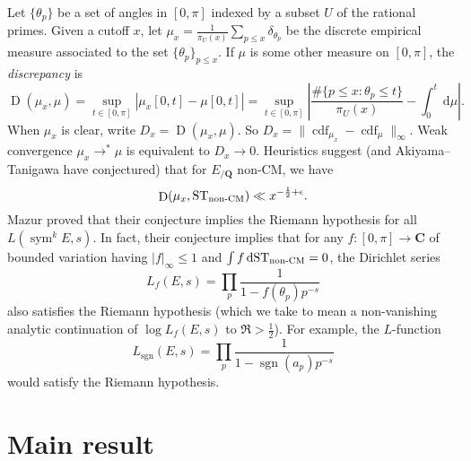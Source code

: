 \documentclass{article}
\DeclareMathOperator{\cdf}{cdf}
\DeclareMathOperator{\D}{D}
\DeclareMathOperator{\sgn}{sgn}
\DeclareMathOperator{\sym}{sym}
\newcommand{\bC}{\mathbf{C}}
\newcommand{\bQ}{\mathbf{Q}}
\newcommand{\dd}{\mathrm{d}}
\newcommand{\nonCM}{\textnormal{non-CM}}
\newcommand{\ST}{\mathrm{ST}}
\begin{document}
Let $\{\theta_p\}$ be a set of angles in $[0,\pi]$ indexed by a subset $U$ of 
the rational primes. Given a cutoff $x$, let 
$\mu_x = \frac{1}{\pi_U(x)}\sum_{p\leqslant x} \delta_{\theta_p}$ be the 
discrete empirical measure associated to the set $\{\theta_p\}_{p\leqslant x}$. 
If $\mu$ is some other measure on $[0,\pi]$, the \emph{discrepancy} is 
\[
	\D(\mu_x,\mu) = \sup_{t\in [0,\pi]} \left| \mu_x[0,t] - \mu[0,t]\right| = \sup_{t\in [0,\pi]} \left| \frac{\#\{p\leqslant x : \theta_p \leqslant t\}}{\pi_U(x)} - \int_0^t \, \dd \mu\right| .
\]
When $\mu_x$ is clear, write $D_x = \D(\mu_x,\mu)$. So 
$D_x = \|\cdf_{\mu_x} - \cdf_\mu\|_\infty$. Weak convergence 
$\mu_x \to^\ast \mu$ is equivalent to $D_x \to 0$. Heuristics suggest (and 
Akiyama--Tanigawa have conjectured) that for $E_{/\bQ}$ non-CM, we have 
\[
	\D(\mu_x,\ST_\nonCM) \ll x^{-\frac 1 2+\epsilon} .
\] 
Mazur proved that their conjecture implies the Riemann hypothesis for all 
$L(\sym^k E,s)$. In fact, their conjecture implies that for any 
$f\colon [0,\pi] \to \bC$ of bounded variation having $|f|_\infty \leqslant 1$ 
and $\int f\,\dd \ST_\nonCM = 0$, the Dirichlet series 
\[
	L_f(E,s) = \prod_p \frac{1}{1 - f(\theta_p) p^{-s}}
\] 
also satisfies the Riemann hypothesis (which we take to mean a non-vanishing 
analytic continuation of $\log L_f(E,s)$ to $\Re > \frac 1 2$). For example, 
the $L$-function 
\[
	L_{\sgn}(E,s) = \prod_p \frac{1}{1 - \sgn(a_p) p^{-s}}
\]
would satisfy the Riemann hypothesis. 





\section{Main result}
\end{document}
